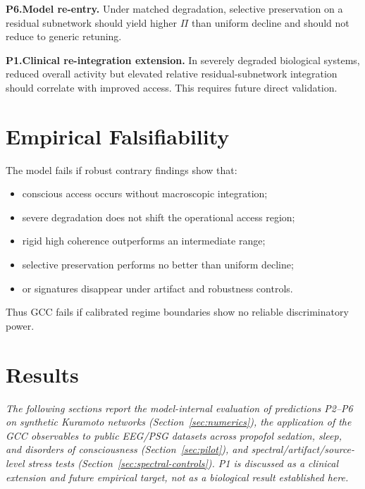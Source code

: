 \documentclass[11pt,a4paper]{article}
\theoremstyle{plain}
\theoremstyle{definition}
\theoremstyle{remark}
\begin{document}
\medskip
\noindent\textbf{P6.\;Model re-entry.}\quad
Under matched degradation, selective preservation on a residual subnetwork should yield higher $\Pi$ than uniform decline and should not reduce to generic retuning.

\medskip
\noindent\textbf{P1.\;Clinical re-integration extension.}\quad
In severely degraded biological systems, reduced overall activity but elevated relative residual-subnetwork integration should correlate with improved access. This requires future direct validation.


\section{Empirical Falsifiability}
\label{sec:falsifizierbarkeit}

The model fails if robust contrary findings show that:
\begin{itemize}
\item conscious access occurs without macroscopic integration;
\item severe degradation does not shift the operational access region;
\item rigid high coherence outperforms an intermediate range;
\item selective preservation performs no better than uniform decline;
\item or signatures disappear under artifact and robustness controls.
\end{itemize}

Thus GCC fails if calibrated regime boundaries show no reliable discriminatory power.


\section*{Results}

\noindent\textit{The following sections report the model-internal evaluation of predictions P2--P6 on synthetic Kuramoto networks (Section~\ref{sec:numerics}), the application of the GCC observables to public EEG/PSG datasets across propofol sedation, sleep, and disorders of consciousness (Section~\ref{sec:pilot}), and spectral/artifact/source-level stress tests (Section~\ref{sec:spectral-controls}). P1 is discussed as a clinical extension and future empirical target, not as a biological result established here.}
\end{document}
